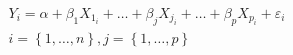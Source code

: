 \begin{equation}
	\begin{array}{cc}
		Y_i                                
		=                                  
		\alpha                             
		+                                  
		\beta_1                            
		X_{1_{i}}                          
		+                                  
		\dots                             
		+                                  
		\beta_j                            
		X_{j_{i}}                          
		+                                  
		\dots                             
		+                                  
		\beta_p                            
		X_{p_{i}}                          
		+                                  
		\varepsilon_{i}                    \\
		i = \left\{ 1, \dots, n \right\}, 
		j = \left\{ 1, \dots, p \right\}  
	\end{array}
	\label{eq:strRegression-reg-scalar}
\end{equation}
